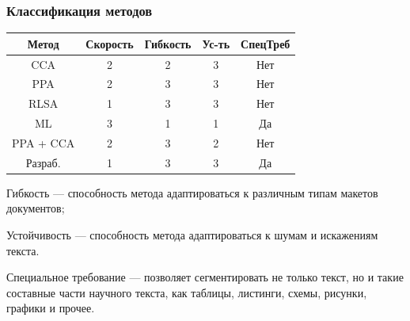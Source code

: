 \documentclass[gray]{beamer}
\begin{document}
\begin{frame}
    \frametitle{Классификация методов}

    \begin{table}[H]
        \begin{center}
            \begin{tabular}{|c|c|c|c|c|}
                \hline
                \textbf{Метод} & \textbf{Скорость} & \textbf{Гибкость} & \textbf{Ус-ть} & \textbf{СпецТреб} \\ \hline
                CCA        & 2 & 2 & 3 & Нет \\ \hline
                PPA        & 2 & 3 & 3 & Нет \\ \hline
                RLSA       & 1 & 3 & 3 & Нет \\ \hline
                ML         & 3 & 1 & 1 & Да \\ \hline
                PPA + CCA  & 2 & 3 & 2 & Нет \\ \hline
                Разраб.    & 1 & 3 & 3 & Да \\ \hline
            \end{tabular}
        \end{center}
    \end{table}


    Гибкость --- способность метода адаптироваться к различным типам макетов документов;

    \vspace{0.2cm}

    Устойчивость --- способность метода адаптироваться к шумам и искажениям текста.

    \vspace{0.2cm}

    Специальное требование --- позволяет сегментировать не только текст, но и такие составные части научного текста, как таблицы, листинги, схемы, рисунки, графики и прочее.
\end{frame}
\end{document}
